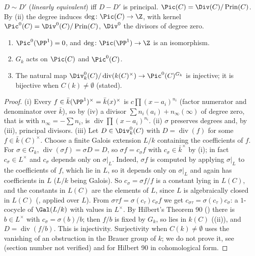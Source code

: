 \begin{definition}\label{def:curves:picard}
$D\sim D'$ (\emph{linearly equivalent}) iff $D-D'$ is principal. $\Pic(C)=\Div(C)/\operatorname{Prin}(C)$. By (ii) the degree
induces $\deg\colon\Pic(C)\to\Z$, with kernel $\Pic^0(C)=\Div^0(C)/\operatorname{Prin}(C)$, $\Div^0$ the divisors of degree zero.
\end{definition}

\begin{proposition}\label{prop:curves:picard}
\leavevmode
\begin{enumerate}[label=(\roman*)]
\item $\Pic^0(\PP^1)=0$, and $\deg\colon\Pic(\PP^1)\to\Z$ is an isomorphism.
\item $G_k$ acts on $\Pic(C)$ and $\Pic^0(C)$.
\item The natural map $\Div^0_k(C)/\operatorname{div}(k(C)^\times)\to\Pic^0(C)^{G_k}$ is injective; it is bijective when $C(k)\ne\emptyset$ (stated).
\end{enumerate}
\end{proposition}

\begin{proof}
(i) Every $f\in\bar k(\PP^1)^\times=\bar k(x)^\times$ is $c\prod(x-a_i)^{n_i}$ (factor numerator and denominator over $\bar k$), so by
(iv) a divisor $\sum n_i(a_i)+n_\infty(\infty)$ of degree zero, that is with $n_\infty=-\sum n_i$, is $\operatorname{div}\prod(x-a_i)^{n_i}$.
(ii) $\sigma$ preserves degrees and, by (iii), principal divisors.
(iii) Let $D\in\Div^0_k(C)$ with $D=\operatorname{div}(f)$ for some $f\in\bar k(C)^\times$. Choose a finite Galois extension $L/k$ containing the coefficients of
$f$. For $\sigma\in G_k$, $\operatorname{div}(\sigma f)=\sigma D=D$, so $\sigma f=c_\sigma f$ with $c_\sigma\in\bar k^\times$ by (i); in fact $c_\sigma\in L^\times$ and
$c_\sigma$ depends only on $\sigma|_L$. Indeed, $\sigma f$ is computed by applying $\sigma|_L$ to the coefficients of $f$, which lie in $L$, so it depends only on
$\sigma|_L$ and again has coefficients in $L$ ($L/k$ being Galois). So $c_\sigma=\sigma f/f$ is a constant lying in $L(C)$, and the constants in $L(C)$ are the
elements of $L$, since $L$ is algebraically closed in $L(C)$ (, applied over $L$). From $\sigma\tau f=\sigma(c_\tau)c_\sigma f$ we get $c_{\sigma\tau}=\sigma(c_\tau)c_\sigma$: a $1$-cocycle of $\Gal(L/k)$ with values in $L^\times$. By
Hilbert's Theorem 90 () there is $b\in L^\times$ with $c_\sigma=\sigma(b)/b$; then $f/b$ is fixed by $G_k$, so lies in $k(C)$
((ii)), and $D=\operatorname{div}(f/b)$. This is injectivity. Surjectivity when $C(k)\ne\emptyset$ uses the vanishing of an
obstruction in the Brauer group of $k$; we do not prove it, see \cite[Section 1]{MilneJacobian86} (section number not verified) and
 for Hilbert 90 in cohomological form.
\end{proof}

